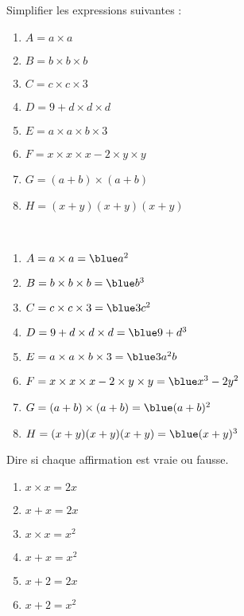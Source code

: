 \begin{colonne*exercice}
\bigskip

\begin{exercice} %
   Simplifier les expressions suivantes :
   \begin{enumerate}
      \item $A =a\times a$
      \item $B =b\times b\times b$
      \item $C =c\times c\times3$
      \item $D =9+d\times d\times d$
      \item $E =a\times a\times b\times3$
      \item $F =x\times x\times x-2\times y\times y$
      \item $G =(a+b)\times(a+b)$
      \item $H =(x+y)(x+y)(x+y)$
   \end{enumerate}
\end{exercice}

\begin{corrige}
   \ \\ [-5mm]
   \begin{enumerate}
      \item $A =a\times a =\blue a^2$
      \item $B =b\times b\times b =\blue b^3$
      \item $C =c\times c\times3 =\blue3c^2$
      \item $D =9+d\times d\times d =\blue9+d^3$
      \item $E =a\times a\times b\times3 =\blue3a^2b$
      \item $F =x\times x\times x-2\times y\times y =\blue x^3-2y^2$
      \item $G =(a+b)\times(a+b) =\blue(a+b)^2$
      \item $H =(x+y)(x+y)(x+y) =\blue(x+y)^3$ \medskip
   \end{enumerate}
\end{corrige}

\bigskip


\begin{exercice} %
   Dire si chaque affirmation est vraie ou fausse.
   \begin{enumerate}
      \item $x\times x = 2x$
      \item $x+x = 2x$
      \item $x\times x = x^{2}$
      \item $x+x =x^{2}$
      \item $x+2 =2x$
      \item $x+2=x^{2}$
   \end{enumerate}
\end{exercice}


\end{colonne*exercice}
